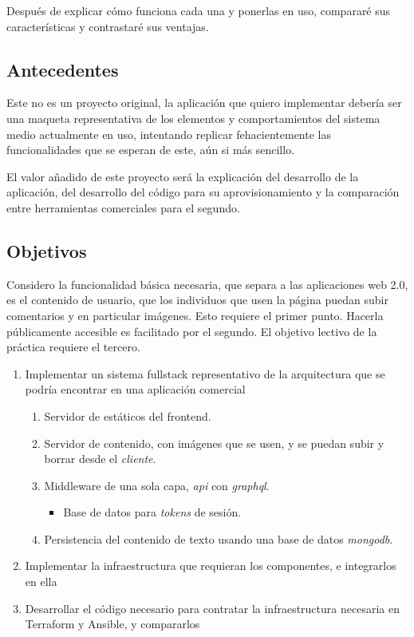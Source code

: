 \documentclass[11pt]{article}
\begin{document}
\begin{flushleft}
Después de explicar cómo funciona cada una y ponerlas en uso, compararé sus características y contrastaré sus ventajas.

    \bigskip
    \bigskip
    
	\subsection{Antecedentes}
	Este no es un proyecto original, la aplicación que quiero implementar debería ser una maqueta representativa de los elementos y comportamientos del sistema medio actualmente en uso, intentando replicar fehacientemente las funcionalidades que se esperan de este, aún si más sencillo. 
    \linebreak
    
    El valor añadido de este proyecto será la explicación del desarrollo de la aplicación, del desarrollo del código para su aprovisionamiento y la comparación entre herramientas comerciales para el segundo.

	\clearpage
	\subsection{Objetivos}
    Considero la funcionalidad básica necesaria, que separa a las aplicaciones web 2.0, es el contenido de usuario, que los individuos que usen la página puedan subir comentarios y en particular imágenes. Esto requiere el primer punto. Hacerla públicamente accesible es facilitado por el segundo. El objetivo lectivo de la práctica requiere el tercero.
    
		\begin{enumerate}
			\itemsep0em 
			\item Implementar un sistema fullstack representativo de la arquitectura que se podría encontrar en una aplicación comercial
				\begin{enumerate}
					\itemsep0em 
					\item Servidor de estáticos del frontend.
					\item Servidor de contenido, con imágenes que se usen, y se puedan subir y borrar desde el \textit{\gls{cliente}}.
					\item Middleware de una sola capa, \textit{\acrshort{api}} con \textit{\gls{graphql}}.
						\begin{itemize}
							\itemsep0em 
							\item Base de datos para \textit{\gls{token}s} de sesión.
						\end{itemize}
					\item Persistencia del contenido de texto usando una base de datos \textit{\gls{mongodb}}.
				\end{enumerate}
            \item Implementar la infraestructura que requieran los componentes, e integrarlos en ella
			\item Desarrollar el código necesario para contratar la infraestructura necesaria en Terraform y Ansible, y compararlos
		\end{enumerate}


\end{flushleft}
\end{document}
